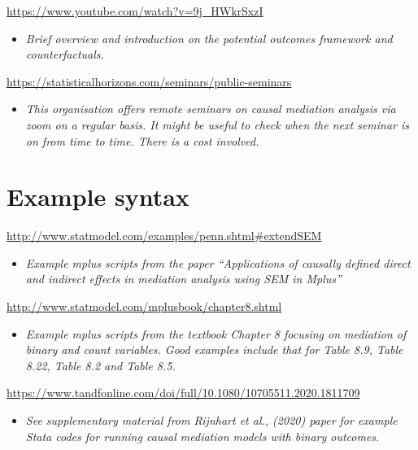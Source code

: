 \documentclass[
]{book}
\providecommand{\tightlist}{%
  \setlength{\itemsep}{0pt}\setlength{\parskip}{0pt}}
\begin{document}
\url{https://www.youtube.com/watch?v=9j_HWkrSxzI}

\begin{itemize}
\tightlist
\item
  \emph{Brief overview and introduction on the potential outcomes framework and counterfactuals.}
\end{itemize}

\url{https://statisticalhorizons.com/seminars/public-seminars}

\begin{itemize}
\tightlist
\item
  \emph{This organisation offers remote seminars on causal mediation analysis via zoom on a regular basis. It might be useful to check when the next seminar is on from time to time. There is a cost involved.}
\end{itemize}

\hypertarget{example-syntax-1}{%
\section{Example syntax}\label{example-syntax-1}}

\url{http://www.statmodel.com/examples/penn.shtml\#extendSEM}

\begin{itemize}
\tightlist
\item
  \emph{Example mplus scripts from the paper ``Applications of causally defined direct and indirect effects in mediation analysis using SEM in Mplus''}
\end{itemize}

\url{http://www.statmodel.com/mplusbook/chapter8.shtml}

\begin{itemize}
\tightlist
\item
  \emph{Example mplus scripts from the textbook Chapter 8 focusing on mediation of binary and count variables. Good examples include that for Table 8.9, Table 8.22, Table 8.2 and Table 8.5.}
\end{itemize}

\url{https://www.tandfonline.com/doi/full/10.1080/10705511.2020.1811709}

\begin{itemize}
\tightlist
\item
  \emph{See supplementary material from Rijnhart et al., (2020) paper for example Stata codes for running causal mediation models with binary outcomes.}
\end{itemize}
\end{document}

